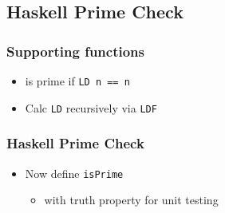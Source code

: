\subsection{Haskell Prime Check}

\begin{frame}
  \frametitle{Supporting functions}
  \begin{itemize}
    \item is prime if \texttt{LD n == n}
    \item Calc \texttt{LD} recursively via \texttt{LDF}
  \end{itemize}
  
\end{frame}


\begin{frame}
  \frametitle{Haskell Prime Check}
  \begin{itemize}
    \item Now define \texttt{isPrime}
      \begin{itemize}
        \item with truth property for unit testing
      \end{itemize}
  \end{itemize}
  
\end{frame}